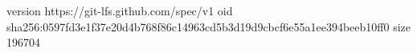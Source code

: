 version https://git-lfs.github.com/spec/v1
oid sha256:0597fd3e1f37e20d4b768f86c14963cd5b3d19d9cbcf6e55a1ee394beeb10ff0
size 196704

